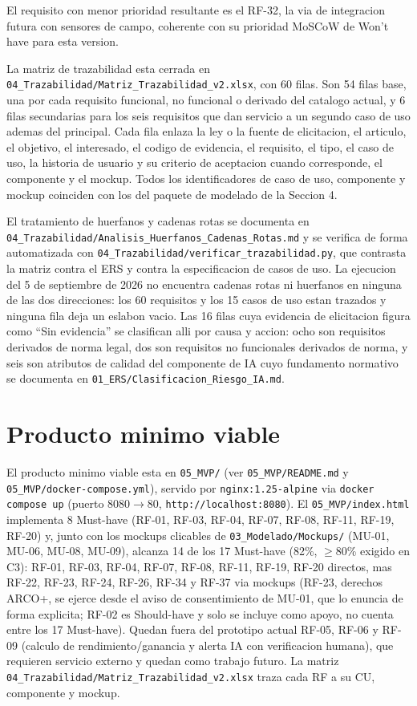 \documentclass[11pt,a4paper]{article}
\newcommand{\ruta}[1]{\texttt{#1}}
\begin{document}
El requisito con menor prioridad resultante es el RF-32, la via de integracion futura con sensores de campo, coherente con su prioridad MoSCoW de Won't have para esta version.

La matriz de trazabilidad esta cerrada en \ruta{04\_Trazabilidad/Matriz\_Trazabilidad\_v2.xlsx}, con 60 filas. Son 54 filas base, una por cada requisito funcional, no funcional o derivado del catalogo actual, y 6 filas secundarias para los seis requisitos que dan servicio a un segundo caso de uso ademas del principal. Cada fila enlaza la ley o la fuente de elicitacion, el articulo, el objetivo, el interesado, el codigo de evidencia, el requisito, el tipo, el caso de uso, la historia de usuario y su criterio de aceptacion cuando corresponde, el componente y el mockup. Todos los identificadores de caso de uso, componente y mockup coinciden con los del paquete de modelado de la Seccion 4.

El tratamiento de huerfanos y cadenas rotas se documenta en \ruta{04\_Trazabilidad/Analisis\_Huerfanos\_Cadenas\_Rotas.md} y se verifica de forma automatizada con \ruta{04\_Trazabilidad/verificar\_trazabilidad.py}, que contrasta la matriz contra el ERS y contra la especificacion de casos de uso. La ejecucion del 5 de septiembre de 2026 no encuentra cadenas rotas ni huerfanos en ninguna de las dos direcciones: los 60 requisitos y los 15 casos de uso estan trazados y ninguna fila deja un eslabon vacio. Las 16 filas cuya evidencia de elicitacion figura como ``Sin evidencia'' se clasifican alli por causa y accion: ocho son requisitos derivados de norma legal, dos son requisitos no funcionales derivados de norma, y seis son atributos de calidad del componente de IA cuyo fundamento normativo se documenta en \ruta{01\_ERS/Clasificacion\_Riesgo\_IA.md}.


\section{Producto minimo viable}

El producto minimo viable esta en \ruta{05\_MVP/} (ver \ruta{05\_MVP/README.md} y \ruta{05\_MVP/docker-compose.yml}), servido por \texttt{nginx:1.25-alpine} via \texttt{docker compose up} (puerto 8080$\to$80, \texttt{http://localhost:8080}). El \ruta{05\_MVP/index.html} implementa 8 Must-have (RF-01, RF-03, RF-04, RF-07, RF-08, RF-11, RF-19, RF-20) y, junto con los mockups clicables de \ruta{03\_Modelado/Mockups/} (MU-01, MU-06, MU-08, MU-09), alcanza 14 de los 17 Must-have (82\%, $\geq$80\% exigido en C3): RF-01, RF-03, RF-04, RF-07, RF-08, RF-11, RF-19, RF-20 directos, mas RF-22, RF-23, RF-24, RF-26, RF-34 y RF-37 via mockups (RF-23, derechos ARCO+, se ejerce desde el aviso de consentimiento de MU-01, que lo enuncia de forma explicita; RF-02 es Should-have y solo se incluye como apoyo, no cuenta entre los 17 Must-have). Quedan fuera del prototipo actual RF-05, RF-06 y RF-09 (calculo de rendimiento/ganancia y alerta IA con verificacion humana), que requieren servicio externo y quedan como trabajo futuro. La matriz \ruta{04\_Trazabilidad/Matriz\_Trazabilidad\_v2.xlsx} traza cada RF a su CU, componente y mockup.



\end{document}
